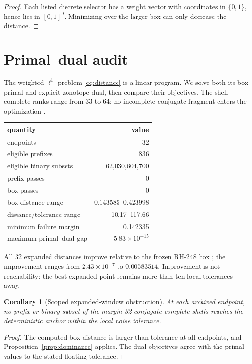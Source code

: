 \documentclass[11pt]{article}
\newtheorem{corollary}[theorem]{Corollary}
\theoremstyle{remark}
\begin{document}
\begin{proof}
Each listed discrete selector has a weight vector with coordinates in
$\{0,1\}$, hence lies in $[0,1]^J$.  Minimizing over the larger box can only
decrease the distance.
\end{proof}

\section{Primal--dual audit}

The weighted $\ell^1$ problem \eqref{eq:distance} is a linear program.  We
solve both its box primal and explicit zonotope dual, then compare their
objectives.  The shell-complete ranks range from 33 to 64; no incomplete
conjugate fragment enters the optimization \citep{WangRH254}.

\begin{center}
\small
\begin{tabular}{lr}
\toprule
quantity & value\\
\midrule
endpoints & 32\\
eligible prefixes & 836\\
eligible binary subsets & 62,030,604,700\\
prefix passes & 0\\
box passes & 0\\
box distance range & 0.143585--0.423998\\
distance/tolerance range & 10.17--117.66\\
minimum failure margin & 0.142335\\
maximum primal--dual gap & $5.83\times10^{-15}$\\
\bottomrule
\end{tabular}
\end{center}

All 32 expanded distances improve relative to the frozen RH-248 box
\citep{WangRH248}; the improvement ranges from
$2.43\times10^{-7}$ to $0.00583514$.  Improvement is not reachability: the
best expanded point remains more than ten local tolerances away.

\begin{corollary}[Scoped expanded-window obstruction]
At each archived endpoint, no prefix or binary subset of the margin-32
conjugate-complete shells reaches the deterministic anchor within the local
noise tolerance.
\end{corollary}

\begin{proof}
The computed box distance is larger than tolerance at all endpoints, and
Proposition~\ref{prop:dominance} applies.  The dual objectives agree with the
primal values to the stated floating tolerance.
\end{proof}
\end{document}
